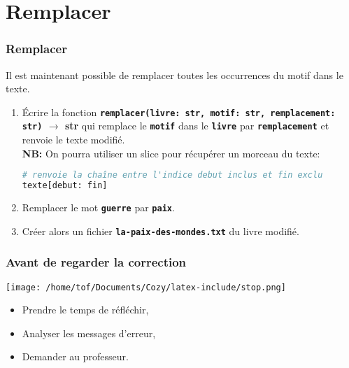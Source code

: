 \documentclass[svgnames,11pt]{beamer}
\begin{document}
\section{Remplacer}
\begin{frame}[fragile]
    \frametitle{Remplacer}

    Il est maintenant possible de remplacer toutes les occurrences du motif dans le texte.
\begin{activite}
\begin{enumerate}
    \item Écrire la fonction \textbf{\texttt{remplacer(livre: str, motif: str, remplacement: str)} $\rightarrow$ str} qui remplace le \texttt{\textbf{motif}} dans le \texttt{\textbf{livre}} par \texttt{\textbf{remplacement}} et renvoie le texte modifié.\\ \textbf{NB:} On pourra utiliser un slice pour récupérer un morceau du texte:
    \begin{lstlisting}[language=Python , basicstyle=\ttfamily\small, xleftmargin=2em, xrightmargin=2em]
# renvoie la chaîne entre l'indice debut inclus et fin exclu
texte[debut: fin]
\end{lstlisting}
    \item Remplacer le mot \texttt{\textbf{guerre}} par \texttt{\textbf{paix}}.
    \item Créer alors un fichier \texttt{\textbf{la-paix-des-mondes.txt}} du livre modifié.
\end{enumerate}
\end{activite}

\end{frame}
\begin{frame}
    \frametitle{Avant de regarder la correction}
\begin{center}
    \centering
    \texttt{[image: /home/tof/Documents/Cozy/latex-include/stop.png]}
    \end{center}
{\Large
    \begin{itemize}
        \item Prendre le temps de réfléchir,
        \item Analyser les messages d'erreur,
        \item Demander au professeur.
    \end{itemize}
}
\end{frame}
\end{document}
